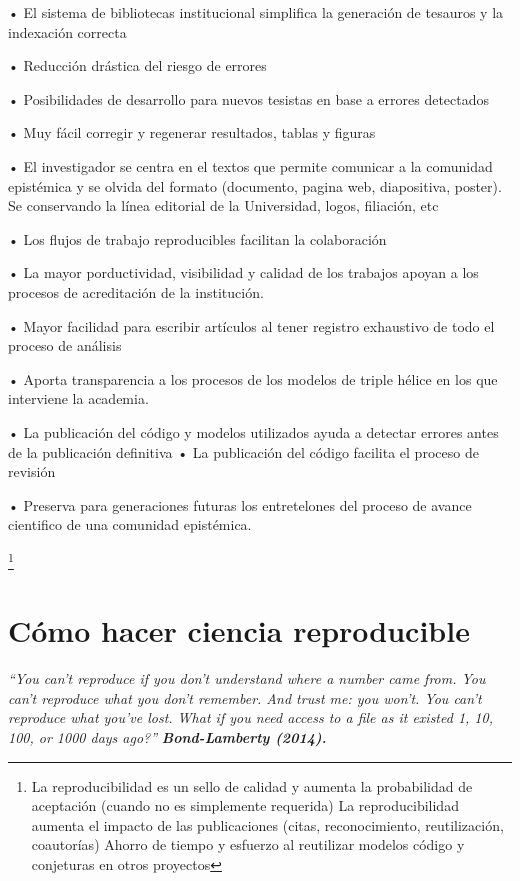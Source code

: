 \documentclass[]{tufte-handout}
\begin{document}
• El sistema de bibliotecas institucional simplifica la generación de
tesauros y la indexación correcta

• Reducción drástica del riesgo de errores

• Posibilidades de desarrollo para nuevos tesistas en base a errores
detectados

• Muy fácil corregir y regenerar resultados, tablas y figuras

• El investigador se centra en el textos que permite comunicar a la
comunidad epistémica y se olvida del formato (documento, pagina web,
diapositiva, poster). Se conservando la línea editorial de la
Universidad, logos, filiación, etc

• Los flujos de trabajo reproducibles facilitan la colaboración

• La mayor porductividad, visibilidad y calidad de los trabajos apoyan a
los procesos de acreditación de la institución.

• Mayor facilidad para escribir artículos al tener registro exhaustivo
de todo el proceso de análisis

• Aporta transparencia a los procesos de los modelos de triple hélice en
los que interviene la academia.

• La publicación del código y modelos utilizados ayuda a detectar
errores antes de la publicación definitiva • La publicación del código
facilita el proceso de revisión

• Preserva para generaciones futuras los entretelones del proceso de
avance cientifico de una comunidad epistémica.

\footnote{La reproducibilidad es un sello de calidad y aumenta la
  probabilidad de aceptación (cuando no es simplemente requerida) La
  reproducibilidad aumenta el impacto de las publicaciones (citas,
  reconocimiento, reutilización, coautorías) Ahorro de tiempo y esfuerzo
  al reutilizar modelos código y conjeturas en otros proyectos}

\hypertarget{cuxf3mo-hacer-ciencia-reproducible}{%
\section{Cómo hacer ciencia
reproducible}\label{cuxf3mo-hacer-ciencia-reproducible}}

\emph{``You can't reproduce if you don't understand where a number came
from. You can't reproduce what you don't remember. And trust me: you
won't. You can't reproduce what you've lost. What if you need access to
a file as it existed 1, 10, 100, or 1000 days ago?''}
\textbf{\emph{Bond-Lamberty (2014).}}
\end{document}
